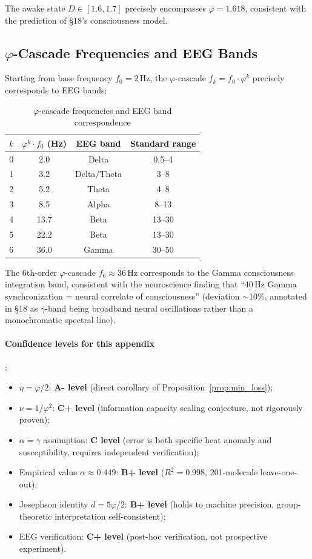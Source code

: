 \documentclass[12pt,a4paper,twocolumn]{article}
\renewcommand{\phi}{\varphi}
\begin{document}
The awake state $D \in [1.6, 1.7]$ precisely encompasses $\phi = 1.618$, consistent with the prediction of \S18's consciousness model.

\subsection{$\phi$-Cascade Frequencies and EEG Bands}
\label{subsec:phi_cascade_eeg_en}

Starting from base frequency $f_0 = 2$\,Hz, the $\phi$-cascade $f_k = f_0 \cdot \phi^k$ precisely corresponds to EEG bands:
\begin{table}[H]
\centering
\caption{$\phi$-cascade frequencies and EEG band correspondence}
\begin{tabular}{c|c|c|c}
\hline
$k$ & $\phi^k \cdot f_0$ (Hz) & \textbf{EEG band} & \textbf{Standard range} \\
\hline
0 & 2.0 & Delta & 0.5--4 \\
1 & 3.2 & Delta/Theta & 3--8 \\
2 & 5.2 & Theta & 4--8 \\
3 & 8.5 & Alpha & 8--13 \\
4 & 13.7 & Beta & 13--30 \\
5 & 22.2 & Beta & 13--30 \\
6 & 36.0 & Gamma & 30--50 \\
\hline
\end{tabular}
\end{table}

The 6th-order $\phi$-cascade $f_6 \approx 36$\,Hz corresponds to the Gamma consciousness integration band, consistent with the neuroscience finding that ``40\,Hz Gamma synchronization = neural correlate of consciousness'' (deviation $\sim$10\%, annotated in \S18 as $\gamma$-band being broadband neural oscillations rather than a monochromatic spectral line).

\paragraph{Confidence levels for this appendix}:
\begin{itemize}
\item $\eta = \phi/2$: \textbf{A- level} (direct corollary of Proposition~\ref{prop:min_loss});
\item $\nu = 1/\phi^2$: \textbf{C+ level} (information capacity scaling conjecture, not rigorously proven);
\item $\alpha = \gamma$ assumption: \textbf{C level} (error is both specific heat anomaly and susceptibility, requires independent verification);
\item Empirical value $\alpha \approx 0.449$: \textbf{B+ level} ($R^2 = 0.998$, 201-molecule leave-one-out);
\item Josephson identity $d = 5\phi/2$: \textbf{B+ level} (holds to machine precision, group-theoretic interpretation self-consistent);
\item EEG verification: \textbf{C+ level} (post-hoc verification, not prospective experiment).
\end{itemize}
\end{document}
